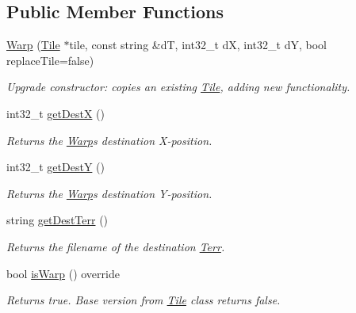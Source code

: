 \subsection*{Public Member Functions}
\begin{DoxyCompactItemize}
\item 
\hyperlink{class_warp_acc48996f1d060ec105de240f7a556c09}{Warp} (\hyperlink{class_tile}{Tile} $\ast$tile, const string \&dT, int32\+\_\+t dX, int32\+\_\+t dY, bool replace\+Tile=false)\hypertarget{class_warp_acc48996f1d060ec105de240f7a556c09}{}\label{class_warp_acc48996f1d060ec105de240f7a556c09}

\begin{DoxyCompactList}\small\item\em Upgrade constructor\+: copies an existing \hyperlink{class_tile}{Tile}, adding new functionality. \end{DoxyCompactList}\item 
int32\+\_\+t \hyperlink{class_warp_a9ffb709f8e9a94e1c2c788473a41095a}{get\+DestX} ()\hypertarget{class_warp_a9ffb709f8e9a94e1c2c788473a41095a}{}\label{class_warp_a9ffb709f8e9a94e1c2c788473a41095a}

\begin{DoxyCompactList}\small\item\em Returns the \hyperlink{class_warp}{Warp}\textquotesingle{}s destination X-\/position. \end{DoxyCompactList}\item 
int32\+\_\+t \hyperlink{class_warp_a5f6fb3a8e3ed0aa7056f98de5bf84ca1}{get\+DestY} ()\hypertarget{class_warp_a5f6fb3a8e3ed0aa7056f98de5bf84ca1}{}\label{class_warp_a5f6fb3a8e3ed0aa7056f98de5bf84ca1}

\begin{DoxyCompactList}\small\item\em Returns the \hyperlink{class_warp}{Warp}\textquotesingle{}s destination Y-\/position. \end{DoxyCompactList}\item 
string \hyperlink{class_warp_a5c61204c5eafbd5dfa8a365c08257eec}{get\+Dest\+Terr} ()\hypertarget{class_warp_a5c61204c5eafbd5dfa8a365c08257eec}{}\label{class_warp_a5c61204c5eafbd5dfa8a365c08257eec}

\begin{DoxyCompactList}\small\item\em Returns the filename of the destination \hyperlink{class_terr}{Terr}. \end{DoxyCompactList}\item 
bool \hyperlink{class_warp_ad747a08d0092f0b7362743b415795054}{is\+Warp} () override\hypertarget{class_warp_ad747a08d0092f0b7362743b415795054}{}\label{class_warp_ad747a08d0092f0b7362743b415795054}

\begin{DoxyCompactList}\small\item\em Returns true. Base version from \hyperlink{class_tile}{Tile} class returns false. \end{DoxyCompactList}\end{DoxyCompactItemize}
